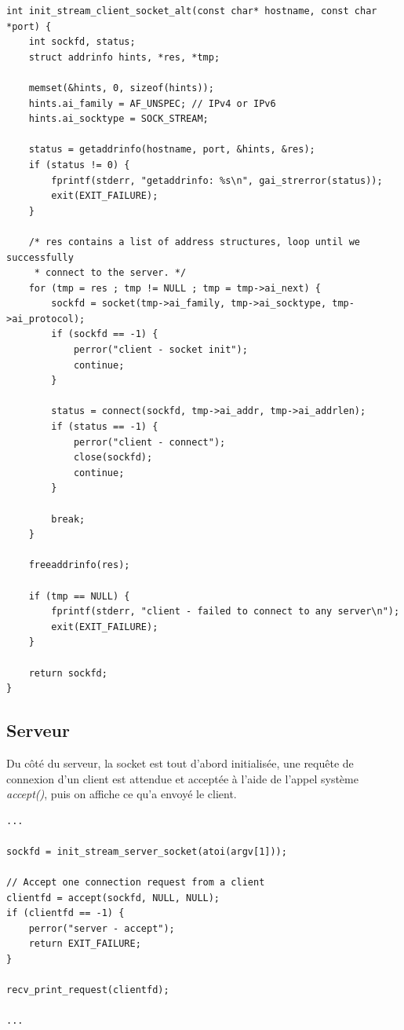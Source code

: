\begin{lstlisting}
int init_stream_client_socket_alt(const char* hostname, const char *port) {
    int sockfd, status;
    struct addrinfo hints, *res, *tmp;

    memset(&hints, 0, sizeof(hints));
    hints.ai_family = AF_UNSPEC; // IPv4 or IPv6
    hints.ai_socktype = SOCK_STREAM;

    status = getaddrinfo(hostname, port, &hints, &res);
    if (status != 0) {
        fprintf(stderr, "getaddrinfo: %s\n", gai_strerror(status));
        exit(EXIT_FAILURE);
    }

    /* res contains a list of address structures, loop until we successfully
     * connect to the server. */
    for (tmp = res ; tmp != NULL ; tmp = tmp->ai_next) {
        sockfd = socket(tmp->ai_family, tmp->ai_socktype, tmp->ai_protocol);
        if (sockfd == -1) {
            perror("client - socket init");
            continue;
        }

        status = connect(sockfd, tmp->ai_addr, tmp->ai_addrlen);
        if (status == -1) {
            perror("client - connect");
            close(sockfd);
            continue;
        }

        break;
    }

    freeaddrinfo(res);

    if (tmp == NULL) {
        fprintf(stderr, "client - failed to connect to any server\n");
        exit(EXIT_FAILURE);
    }

    return sockfd;
}
\end{lstlisting}

\subsection{Serveur}
Du côté du serveur, la socket est tout d'abord initialisée, une requête de connexion d'un client est attendue et acceptée à l'aide de l'appel système \emph{accept()}, puis on affiche ce qu'a envoyé le client.\\

\begin{lstlisting}
...

sockfd = init_stream_server_socket(atoi(argv[1]));

// Accept one connection request from a client
clientfd = accept(sockfd, NULL, NULL);
if (clientfd == -1) {
    perror("server - accept");
    return EXIT_FAILURE;
}

recv_print_request(clientfd);

...
\end{lstlisting}
\

